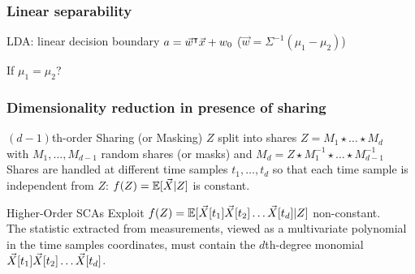 \begin{frame}
\frametitle{Linear separability}
LDA: linear decision boundary $a = \vec{w}^\intercal \vec{x} + w_0$ ($\vec{w} = \Sigma^{-1}(\mu_1-\mu_2)$)
%
\begin{block}{}
\begin{huge}
If $\mu_1 = \mu_2$? 
\end{huge}
\end{block}
\end{frame}

\begin{frame}
\frametitle{Dimensionality reduction in presence of sharing}


\begin{block}{$(d-1)$th-order Sharing (or Masking)}
$Z$ split into shares  $Z = M_1 \star \dots \star M_d$ \\
with $M_1, \dots , M_{d-1}$ random shares (or masks) and $M_d = Z \star M_1^{-1}\star \dots \star M_{d-1}^{-1}$ \\
Shares are handled at different time samples $t_1,\dots, t_d$ so that each time sample is independent from $Z$: $f(Z) = \mathbb{E}[\vec{X}\lvert Z]$ is constant.
\end{block}
\pause
\begin{block}{Higher-Order SCAs}
Exploit $f(Z) = \mathbb{E}[\vec{X}[t_1]\vec{X}[t_2]\dots\vec{X}[t_d]\lvert Z]$ non-constant.\\
 
The statistic extracted from measurements, viewed as a multivariate polynomial in the time samples coordinates, must contain the $d$th-degree monomial $\vec{X}[t_1]\vec{X}[t_2]\dots\vec{X}[t_d]$.
\end{block}

\end{frame}

